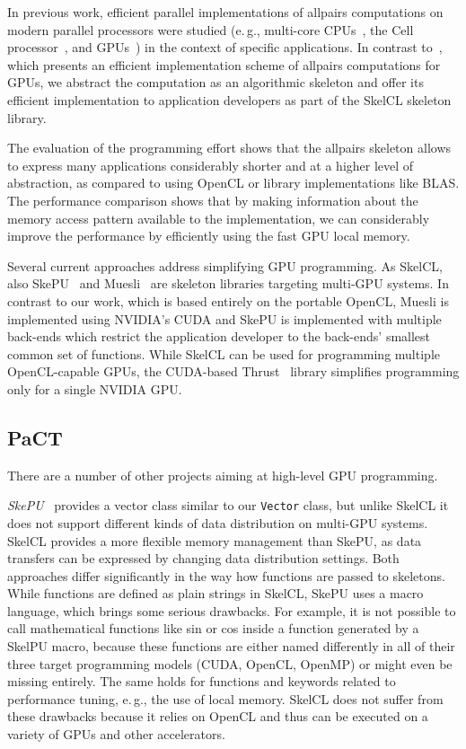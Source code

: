 In previous work, efficient parallel implementations of allpairs computations on modern parallel processors were studied (e.\,g., multi-core CPUs~\cite{ArSV-09}, the Cell processor~\cite{WiSK-09}, and GPUs~\cite{DaDQR-09}) in the context of specific applications.
In contrast to~\cite{SaA-13}, which presents an efficient implementation scheme of allpairs computations for GPUs, we abstract the computation as an algorithmic skeleton and offer its efficient implementation to application developers as part of the SkelCL skeleton library.

The evaluation of the programming effort shows that the allpairs skeleton allows to express many applications considerably shorter and at a higher level of abstraction, as compared to using OpenCL or library implementations like BLAS.
The performance comparison shows that by making information about the memory access pattern available to the implementation, we can considerably improve the performance by efficiently using the fast GPU local memory.

Several current approaches address simplifying GPU programming.
As SkelCL, also SkePU~\cite{EnK-10} and Muesli~\cite{ErK-12} are skeleton libraries targeting multi-GPU systems.
In contrast to our work, which is based entirely on the portable OpenCL, Muesli is implemented using NVIDIA's CUDA and SkePU is implemented with multiple back-ends which restrict the application developer to the back-ends' smallest common set of functions.
While SkelCL can be used for programming multiple OpenCL-capable GPUs, the CUDA-based Thrust~\cite{HoB-09a} library simplifies programming only for a single NVIDIA GPU.

\subsection{PaCT}
There are a number of other projects aiming at high-level GPU programming.

\emph{SkePU}~\cite{EnK-10} provides a vector class similar to our \texttt{Vector} class, but unlike SkelCL it does not support different kinds of data distribution on multi-GPU systems.
SkelCL provides a more flexible memory management than SkePU, as data transfers can be expressed by changing data distribution settings.
Both approaches differ significantly in the way how functions are passed to skeletons.
While functions are defined as plain strings in SkelCL, SkePU uses a macro language, which brings some serious drawbacks.
For example, it is not possible to call mathematical functions like sin or cos inside a function generated by a SkelPU macro,
because these functions are either named differently in all of their three target programming models (CUDA, OpenCL, OpenMP) or might even be missing entirely.
The same holds for functions and keywords related to performance tuning, e.\,g., the use of local memory.
SkelCL does not suffer from these drawbacks because it relies on OpenCL and thus can be executed on a variety of GPUs and other accelerators.

